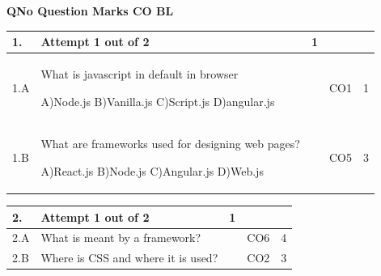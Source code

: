 \documentclass[12pt]{article}
\begin{document}
	\begin{flushleft}
	\bf{QNo}\hspace{1.2cm} \bf{Question} \hspace{5.5cm}  \bf{Marks} \hspace{0.2cm} \bf{CO} \hspace{0.2cm}	\bf{BL}	
	
\end{flushleft} 
	\begin{tabular}{|L{1cm}|L{8cm}|C{1cm}|C{1cm}|C{1cm}|}\hline
		\bf{1}. & \bf{Attempt} \bf1 \bf{out} of \bf2 & \bf1  & & \\ \hline
				1.A & What is javascript in default in browser \newline
					
		A)Node.js\newline
		B)Vanilla.js\newline
		C)Script.js\newline
		D)angular.js &
		 &
		CO1&
		1 \\ \hline
		
				1.B & What are frameworks used for designing web pages? \newline
					
		A)React.js\newline
		B)Node.js\newline
		C)Angular.js\newline
		D)Web.js &
		 &
		CO5&
		3 \\ \hline
		
		
	\end{tabular}

	\begin{tabular}{|L{1cm}|L{8cm}|C{1cm}|C{1cm}|C{1cm}|}\hline
	\bf2. & \bf{Attempt} \bf{1} \bf{out of} \bf{2} & \bf{1}  & & \\ \hline





		2.A &
	What is meant by a framework? \newline
			
	 &   & CO6 & 4\\ \hline
		2.B &
	Where is CSS and where it is used? \newline
			
	 &   & CO2 & 3\\ \hline
	\end{tabular}
\end{document}
